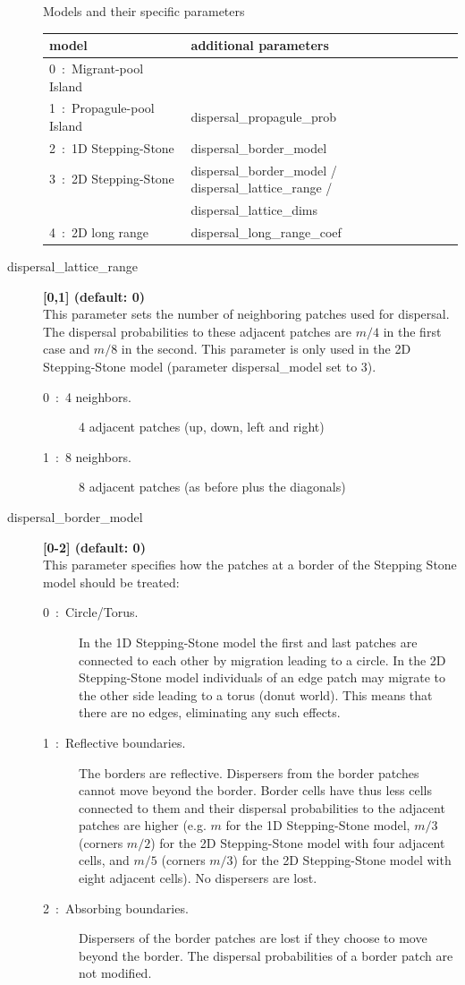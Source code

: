 \documentclass[letterpaper,12pt,oneside]{book}
\begin{document}
\begin{description}
Models and their specific parameters\\
\begin{tabular*}{0.92\textwidth}{ll}
 \hline model & additional parameters \\ 
 \hline
 0~:~Migrant-pool Island    & \\
 1~:~Propagule-pool Island  & dispersal\_propagule\_prob\\
 2~:~1D Stepping-Stone      & dispersal\_border\_model\\
 3~:~2D Stepping-Stone      & dispersal\_border\_model / dispersal\_lattice\_range / \\
                            & dispersal\_lattice\_dims\\
 4~:~2D long range          & dispersal\_long\_range\_coef\\
 \hline
\end{tabular*}


\item[dispersal\_lattice\_range\index{dispersal\_lattice\_range}] \textbf{[0,1] (default: 0)}\\
This parameter sets the number of neighboring patches used for dispersal. The dispersal probabilities to these adjacent patches are $m/4$ in the first case and $m/8$ in the second. This parameter is only used in the 2D Stepping-Stone model (parameter \textsf{dispersal\_model} set to 3).
\begin{description}
\item[0~:~4 neighbors.]4 adjacent patches (up, down, left and right)
\item[1~:~8 neighbors.]8 adjacent patches (as before plus the diagonals)
\end{description}

\item[dispersal\_border\_model\index{dispersal\_border\_model}] \textbf{[0-2] (default: 0)}\\
This parameter specifies how the patches at a border of the Stepping Stone model should be treated:
\begin{description}
\item[0~:~Circle/Torus.] In the 1D Stepping-Stone model the first and last patches are connected to each other by migration leading to a circle. In the 2D Stepping-Stone model individuals of an edge patch may migrate to the other side leading to a torus (donut world). This means that there are no edges, eliminating any such effects.
\item[1~:~Reflective boundaries.] The borders are reflective. Dispersers from the border patches cannot move beyond the border. Border cells have thus less cells connected to them and their dispersal probabilities to the adjacent patches are higher (e.g. $m$ for the 1D Stepping-Stone model, $m/3$ (corners $m/2$) for the 2D Stepping-Stone model with four adjacent cells, and $m/5$ (corners $m/3$) for the 2D Stepping-Stone model with eight adjacent cells). No dispersers are lost.
\item[2~:~Absorbing boundaries.] Dispersers of the border patches are lost if they choose to move beyond the border. The dispersal probabilities of a border patch are not modified. 
\end{description}


\end{description}
\end{document}
